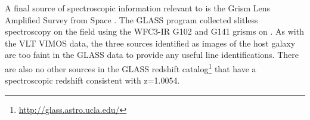 A final source of spectroscopic information relevant to \spock is the
Grism Lens Amplified Survey from Space \citep[GLASS; PID:
  HST-GO-13459; PI:T. Treu;][]{Schmidt:2014,Treu:2015a}. The GLASS
program collected slitless spectroscopy on the  field using
the WFC3-IR G102 and G141 grisms on \HST.  As with the VLT VIMOS data,
the three sources identified as images of the \spock host galaxy are
too faint in the GLASS data to provide any useful line
identifications.  There are also no other sources in the GLASS
redshift catalog\footnote{\url{http://glass.astro.ucla.edu/}} that
have a spectroscopic redshift consistent with z=1.0054.

